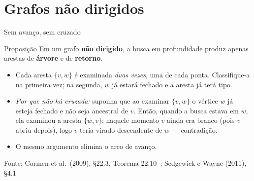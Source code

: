 \documentclass[aspectratio=169]{beamer}
\newcommand{\fonte}[1]{\vfill{\tiny\color{gray!60!black}Fonte: #1\par}}
\begin{document}
\section{Grafos não dirigidos}

\begin{frame}{Sem avanço, sem cruzado}
  \begin{block}{Proposição}
    {\small Em um grafo \textbf{não dirigido}, a busca em profundidade produz
    apenas arestas de \textbf{árvore} e de \textbf{retorno}.}
  \end{block}
  {\small
  \begin{itemize}\small
    \item Cada aresta $\{v,w\}$ é examinada \emph{duas vezes}, uma de cada ponta.
          Classifique-a na primeira vez; na segunda, $w$ já estará fechado e a
          aresta já terá tipo.
    \item \emph{Por que não há cruzada:} suponha que ao examinar $\{v,w\}$ o
          vértice $w$ já esteja fechado e não seja ancestral de $v$. Então,
          quando a busca estava em $w$, ela examinou a aresta $\{w,v\}$; naquele
          momento $v$ ainda era branco (pois $v$ abriu depois), logo $v$ teria
          virado descendente de $w$ --- contradição.
    \item O mesmo argumento elimina o arco de avanço.
  \end{itemize}}
  \fonte{Cormen et al.\ (2009), \S 22.3, Teorema 22.10~\cite{cormen2009introduction}; Sedgewick e Wayne (2011), \S 4.1~\cite{sedgewick2011algorithms}}
\end{frame}
\end{document}
